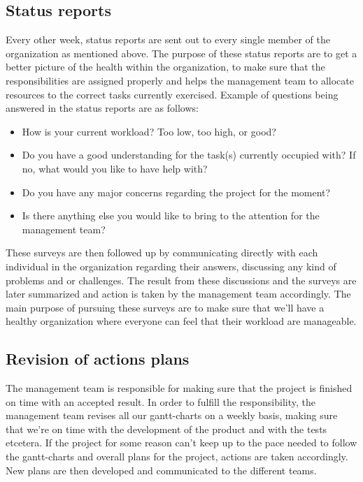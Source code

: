 \subsection{Status reports}
Every other week, status reports are sent out to every single member of the organization as mentioned above. The purpose of these status reports are to get a better picture of the health within the organization, to make sure that the responsibilities are assigned properly and helps the management team to allocate resources to the correct tasks currently exercised. Example of questions being answered in the status reports are as follows:

\begin{itemize}
    \item How is your current workload? Too low, too high, or good?
    \item Do you have a good understanding for the task(s) currently occupied with? If no, what would you like to have help with?
    \item Do you have any major concerns regarding the project for the moment?
    \item Is there anything else you would like to bring to the attention for the management team?
\end{itemize}

These surveys are then followed up by communicating directly with each individual in the organization regarding their answers, discussing any kind of problems and or challenges. The result from these discussions and the surveys are later summarized and action is taken by the management team accordingly. The main purpose of pursuing these surveys are to make sure that we'll have a healthy organization where everyone can feel that their workload are manageable. 

\subsection{Revision of actions plans}
The management team is responsible for making sure that the project is finished on time with an accepted result. In order to fulfill the responsibility, the management team revises all our gantt-charts on a weekly basis, making sure that we're on time with the development of the product and with the tests etcetera. If the project for some reason can't keep up to the pace needed to follow the gantt-charts and overall plans for the project, actions are taken accordingly. New plans are then developed and communicated to the different teams. 

